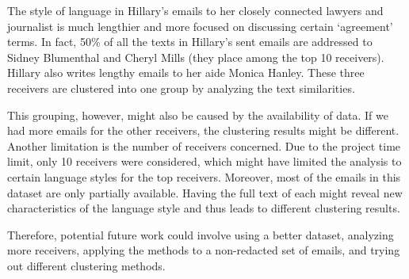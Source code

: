 The style of language in Hillary's emails to her closely connected lawyers and journalist is much lengthier and more focused on discussing certain `agreement' terms. In fact, 50\% of all the texts in Hillary's sent emails are addressed to Sidney Blumenthal and Cheryl Mills (they place among the top 10 receivers). Hillary also writes lengthy emails to her aide Monica Hanley. These three receivers are clustered into one group by analyzing the text similarities. 

This grouping, however, might also be caused by the availability of data. If we had more emails for the other receivers, the clustering results might be different. Another limitation is the number of receivers concerned. Due to the project time limit, only 10 receivers were considered, which might have limited the analysis to certain language styles for the top receivers. Moreover, most of the emails in this dataset are only partially available. Having the full text of each might reveal new characteristics of the language style and thus leads to different clustering results.

Therefore, potential future work could involve using a better dataset, analyzing more receivers, applying the methods to a non-redacted set of emails, and trying out different clustering methods.